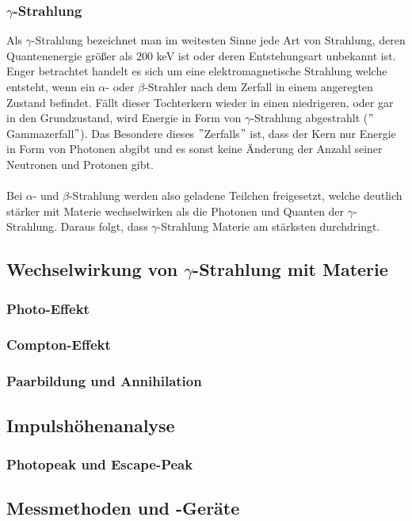\subsubsection*{$\gamma$-Strahlung}
Als $\gamma$-Strahlung bezeichnet man im weitesten Sinne jede Art von Strahlung, deren Quantenenergie größer als 200 keV ist oder deren Entstehungsart unbekannt ist. Enger betrachtet handelt es sich um eine elektromagnetische Strahlung welche entsteht, wenn ein $\alpha$- oder $\beta$-Strahler nach dem Zerfall in einem angeregten Zustand befindet. Fällt dieser Tochterkern wieder in einen niedrigeren, oder gar in den Grundzustand, wird Energie in Form von $\gamma$-Strahlung abgestrahlt ($"$Gammazerfall$"$). Das Besondere dieses $"$Zerfalls$"$ ist, dass der Kern nur Energie in Form von Photonen abgibt und es sonst keine Änderung der Anzahl seiner Neutronen und Protonen gibt.\\
\\
Bei $\alpha$- und $\beta$-Strahlung werden also geladene Teilchen freigesetzt, welche deutlich stärker mit Materie wechselwirken als die Photonen und Quanten der $\gamma$-Strahlung. Daraus folgt, dass $\gamma$-Strahlung Materie am stärksten durchdringt.

\subsection{Wechselwirkung von $\gamma$-Strahlung mit Materie}
\subsubsection*{Photo-Effekt}
\subsubsection*{Compton-Effekt}
\subsubsection*{Paarbildung und Annihilation}
\subsection{Impulshöhenanalyse}
\subsubsection*{Photopeak und Escape-Peak}
\subsection{Messmethoden und -Geräte}
